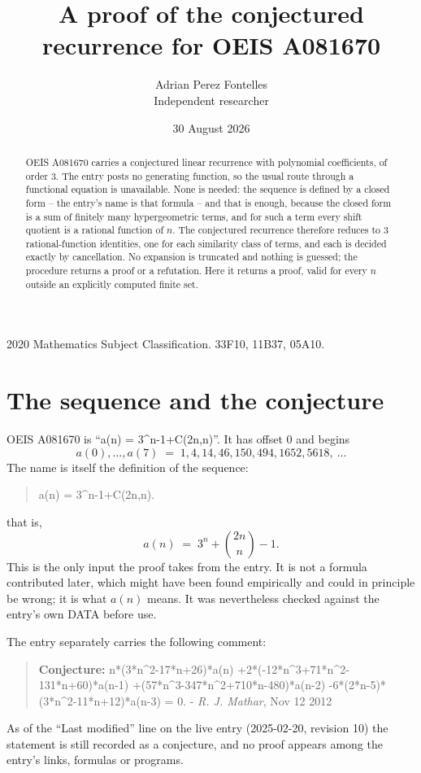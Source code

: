 \documentclass[11pt,a4paper]{article}
\title{A proof of the conjectured recurrence for OEIS A081670}
\author{Adrian Perez Fontelles\\ \small Independent researcher}
\date{30 August 2026}
\theoremstyle{plain}
\theoremstyle{definition}
\begin{document}
\maketitle

\begin{abstract}
OEIS A081670 carries a conjectured linear recurrence with polynomial coefficients, of
order 3. The entry posts no generating function, so the usual route through a
functional equation is unavailable. None is needed: the sequence is defined by a closed
form -- the entry's name is that formula -- and that is enough, because the closed form is a sum of finitely many hypergeometric terms, and for such a
term every shift quotient is a rational function of $n$. The conjectured recurrence
therefore reduces to 3 rational-function identities, one for each similarity
class of terms, and each is decided exactly by cancellation. No expansion is truncated and
nothing is guessed; the procedure returns a proof or a refutation. Here it returns a proof,
valid for every $n$ outside an explicitly computed finite set.
\end{abstract}

\noindent\small 2020 Mathematics Subject Classification. 33F10, 11B37, 05A10.\normalsize

\section{The sequence and the conjecture}

OEIS A081670 is ``a(n) = 3\textasciicircum{}n-1+C(2n,n)''. It has offset $0$ and begins
\[
a(0),\dots,a(7)\;=\;1, 4, 14, 46, 150, 494, 1652, 5618,\ \dots
\]
The name is itself the definition of the sequence:
\begin{quote}\small
a(n) = 3\textasciicircum{}n-1+C(2n,n).
\end{quote}
that is,
\begin{equation}\label{eq:cf}
a(n)\;=\;3^{n} + {\binom{2 n}{n}} - 1 .
\end{equation}
This is the only input the proof takes from the entry. It is not a formula contributed
later, which might have been found empirically and could in principle be wrong; it is what
$a(n)$ means. It was nevertheless checked against the entry's own DATA before use.

The entry separately carries the following comment:
\begin{quote}\small
\textbf{Conjecture:} n*(3*n\textasciicircum{}2-17*n+26)*a(n) +2*(-12*n\textasciicircum{}3+71*n\textasciicircum{}2-131*n+60)*a(n-1) +(57*n\textasciicircum{}3-347*n\textasciicircum{}2+710*n-480)*a(n-2) -6*(2*n-5)*(3*n\textasciicircum{}2-11*n+12)*a(n-3) = 0. - \emph{R. J. Mathar}, Nov 12 2012
\end{quote}
As of the ``Last modified'' line on the live entry (2025-02-20, revision 10) the
statement is still recorded as a conjecture, and no proof appears among the entry's links,
formulas or programs.
\end{document}
